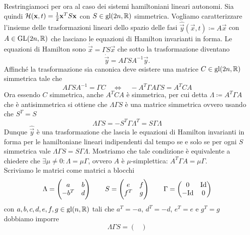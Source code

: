 \begin{example} \label{es:ham-quadratica-canoniche}
    Restringiamoci per ora al caso dei sistemi hamiltoniani lineari autonomi. Sia quindi $ \mathcal{H}(\mathbf{x}, t) = \frac{1}{2} \mathbf{x}^T S \mathbf{x} $ con $ S \in \mathrm{gl}(2n, \mathbb{R}) $ simmetrica. Vogliamo caratterizzare l'insieme delle trasformazioni lineari dello spazio delle fasi $ \hat{\vec{y}}(\vec{x}, t) \coloneqq A \vec{x} $ con $ A \in \mathrm{GL}(2n, \mathbb{R}) $ che lasciano le equazioni di Hamilton invarianti in forma. Le equazioni di Hamilton sono $ \dot{\vec{x}} = \Gamma S \vec{x} $ che sotto la trasformazione diventano
    \[
        \dot{\vec{y}} = A \Gamma S A^{-1} \vec{y}.
    \]
    Affinché la trasformazione sia canonica deve esistere una matrice $ C \in \mathrm{gl}(2n, \mathbb{R}) $ simmetrica tale che
    \[
        A \Gamma S A^{-1} = \Gamma C \quad \iff \quad - A^T \Gamma A \Gamma S = A^T C A
    \]
    Ora essendo $ C $ simmetrica, anche $ A^T C A $ è simmetrica, per cui detta $ \Lambda \coloneqq A^T \Gamma A $ che è antisimmetrica si ottiene che $ \Lambda \Gamma S $ è una matrice simmetrica ovvero usando che $ S^T = S $
    \[
        \Lambda \Gamma S = - S^T \Gamma \Lambda^T = S \Gamma \Lambda
    \]
    Dunque $ \hat{\vec{y}} $ è una trasformazione che lascia le equazioni di Hamilton invarianti in forma per le hamiltoniane lineari indipendenti dal tempo se e solo se per ogni $ S $ simmetrica vale $ \Lambda \Gamma S = S \Gamma \Lambda $. Mostriamo che tale condizione è equivalente a chiedere che $ \exists \mu \neq 0  : \Lambda = \mu \Gamma $, ovvero $ A $ è $ \mu $-simplettica: $ A^T \Gamma A = \mu \Gamma $. \\
    Scriviamo le matrici come matrici a blocchi
    \[
        \Lambda =
        \begin{pmatrix}
            a & b \\
            -b^T & d
        \end{pmatrix}
        \qquad
        S =
        \begin{pmatrix}
            e & f \\
            f^T & g
        \end{pmatrix}
        \qquad
        \Gamma =
        \begin{pmatrix}
        0 & \mathrm{Id} \\
        -\mathrm{Id} & 0
        \end{pmatrix}
    \]
    con $ a, b, c, d, e, f, g \in \mathrm{gl}(n, \mathbb{R}) $ tali che $ a^T = -a $, $ d^T = -d $, $ e^T = e $ e $ g^T = g $ dobbiamo imporre
    \[
        \Lambda \Gamma S =
        \begin{pmatrix}

\end{pmatrix}\]
\end{example}
